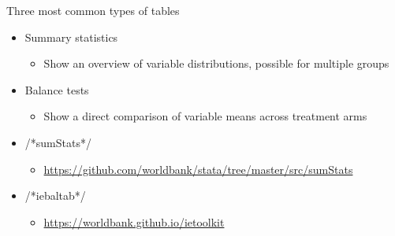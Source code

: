 \documentclass[aspectratio=169]{beamer}
\begin{document}
\begin{frame}[fragile]{Three most common types of tables}
\begin{multicols}{2}	
	\begin{itemize}
		\item Summary statistics
			\begin{itemize}
				\item Show an overview of variable distributions, possible for multiple groups
			\end{itemize}
		\item Balance tests
			\begin{itemize}
				\item Show a direct comparison of variable means across treatment arms
			\end{itemize}
	\end{itemize}

	\begin{itemize}
		\item /*sumStats*/
		\begin{itemize}
			\item \url{https://github.com/worldbank/stata/tree/master/src/sumStats}
		\end{itemize}
		\item /*iebaltab*/
		\begin{itemize}
			\item \url{https://worldbank.github.io/ietoolkit}
		\end{itemize}
	\end{itemize}
\end{multicols}
\end{frame}
\end{document}
